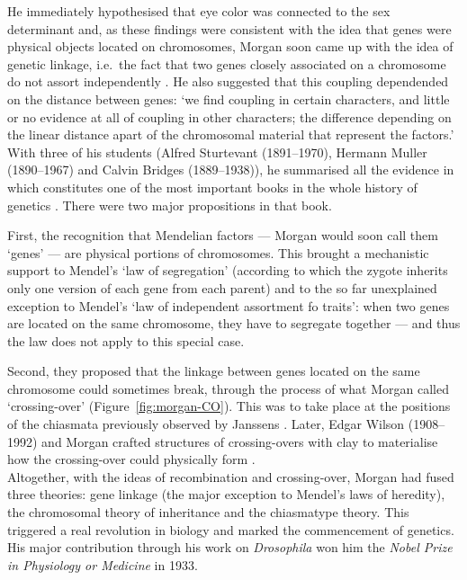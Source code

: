 He immediately hypothesised that eye color was connected to the sex determinant \citep{morgan1910sex} and, as these findings were consistent with the idea that genes were physical objects located on chromosomes, Morgan soon came up with the idea of genetic linkage, i.e.\ the fact that two genes closely associated on a chromosome do not assort independently \citep{morgan1911random}. 
He also suggested that this coupling dependended on the distance between genes: ‘we find coupling in certain characters, and little or no evidence at all of coupling in other characters; the difference depending on the linear distance apart of the chromosomal material that represent the factors.’\\

With three of his students (Alfred Sturtevant (1891--1970), Hermann Muller (1890--1967) and Calvin Bridges (1889--1938)), he summarised all the evidence in \textit{} which constitutes one of the most important books in the whole history of genetics \citep{gayon2016mendel}.
There were two major propositions in that book. 

First, the recognition that Mendelian factors — Morgan would soon call them ‘genes’ — are physical portions of chromosomes. This brought a mechanistic support to Mendel's ‘law of segregation’ (according to which the zygote inherits only one version of each gene from each parent) and to the so far unexplained exception to Mendel's ‘law of independent assortment fo traits’: when two genes are located on the same chromosome, they have to segregate together — and thus the law does not apply to this special case. 

Second, they proposed that the linkage between genes located on the same chromosome could sometimes break, through the process of what Morgan called ‘crossing-over’ (Figure~\ref{fig:morgan-CO}). This was to take place at the positions of the chiasmata previously observed by Janssens \citep{janssens1909theorie}. Later, Edgar Wilson (1908--1992) and Morgan crafted structures of crossing-overs with clay to materialise how the crossing-over could physically form \citep{wilson1920chiasmatype}.\\

Altogether, with the ideas of recombination and crossing-over, Morgan had fused three theories: gene linkage (the major exception to Mendel's laws of heredity), the chromosomal theory of inheritance and the chiasmatype theory. This triggered a real revolution in biology and marked the commencement of genetics. His major contribution through his work on \textit{Drosophila} won him the \textit{Nobel Prize in Physiology or Medicine} in 1933.

